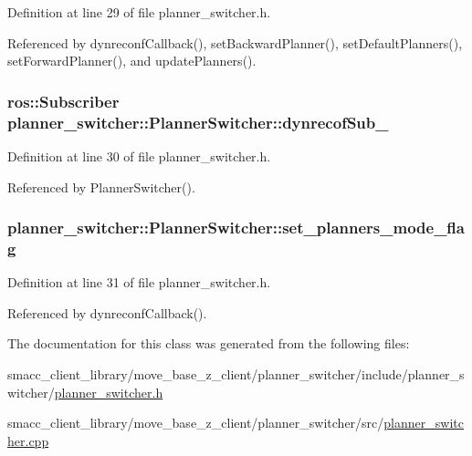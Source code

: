 Definition at line 29 of file planner\+\_\+switcher.\+h.



Referenced by dynreconf\+Callback(), set\+Backward\+Planner(), set\+Default\+Planners(), set\+Forward\+Planner(), and update\+Planners().

\subsubsection[{\texorpdfstring{dynrecof\+Sub\+\_\+}{dynrecofSub_}}]{\setlength{\rightskip}{0pt plus 5cm}ros\+::\+Subscriber planner\+\_\+switcher\+::\+Planner\+Switcher\+::dynrecof\+Sub\+\_\+\hspace{0.3cm}{\ttfamily [private]}}\hypertarget{classplanner__switcher_1_1PlannerSwitcher_ad869a051fd01f362c340280b1ecfbf38}{}\label{classplanner__switcher_1_1PlannerSwitcher_ad869a051fd01f362c340280b1ecfbf38}


Definition at line 30 of file planner\+\_\+switcher.\+h.



Referenced by Planner\+Switcher().

\subsubsection[{\texorpdfstring{set\+\_\+planners\+\_\+mode\+\_\+flag}{set_planners_mode_flag}}]{ planner\+\_\+switcher\+::\+Planner\+Switcher\+::set\+\_\+planners\+\_\+mode\+\_\+flag\hspace{0.3cm}{\ttfamily [private]}}\hypertarget{classplanner__switcher_1_1PlannerSwitcher_ac11d8cdbf44c99c21d3405d32f00a041}{}\label{classplanner__switcher_1_1PlannerSwitcher_ac11d8cdbf44c99c21d3405d32f00a041}


Definition at line 31 of file planner\+\_\+switcher.\+h.



Referenced by dynreconf\+Callback().



The documentation for this class was generated from the following files\+:\begin{DoxyCompactItemize}
\item 
smacc\+\_\+client\+\_\+library/move\+\_\+base\+\_\+z\+\_\+client/planner\+\_\+switcher/include/planner\+\_\+switcher/\hyperlink{planner__switcher_8h}{planner\+\_\+switcher.\+h}\item 
smacc\+\_\+client\+\_\+library/move\+\_\+base\+\_\+z\+\_\+client/planner\+\_\+switcher/src/\hyperlink{planner__switcher_8cpp}{planner\+\_\+switcher.\+cpp}\end{DoxyCompactItemize}

